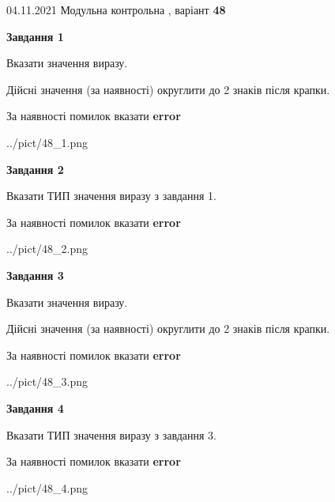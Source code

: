 \documentclass[11pt, ukrainian]{article}
\begin{document}
{04.11.2021 Модульна контрольна , варіант  \No \textbf { 48 }\par}
{
\begin {large}
{\begin {center}\textbf{Завдання 1}\end {center}}\par
Вказати значення виразу. \par
Дійсні значення (за наявності) округлити до 2 знаків після крапки. \par
За наявності помилок вказати \textbf{error}

\begin{center}
	{../pict/48_1.png}
\end{center}
\newpage

{\begin {center}\textbf{Завдання 2}\end {center}}\par
Вказати ТИП значення виразу з завдання 1. \par
За наявності помилок вказати \textbf{error}

\begin{center}
	{../pict/48_2.png}
\end{center}
\newpage

{\begin {center}\textbf{Завдання 3}\end {center}}\par
Вказати значення виразу. \par
Дійсні значення (за наявності) округлити до 2 знаків після крапки. \par
За наявності помилок вказати \textbf{error}

\begin{center}
	{../pict/48_3.png}
\end{center}
\newpage

{\begin {center}\textbf{Завдання 4}\end {center}}\par
Вказати ТИП значення виразу з завдання 3. \par
За наявності помилок вказати \textbf{error}

\begin{center}
	{../pict/48_4.png}
\end{center}
\newpage


\end{large}}
\end{document}
